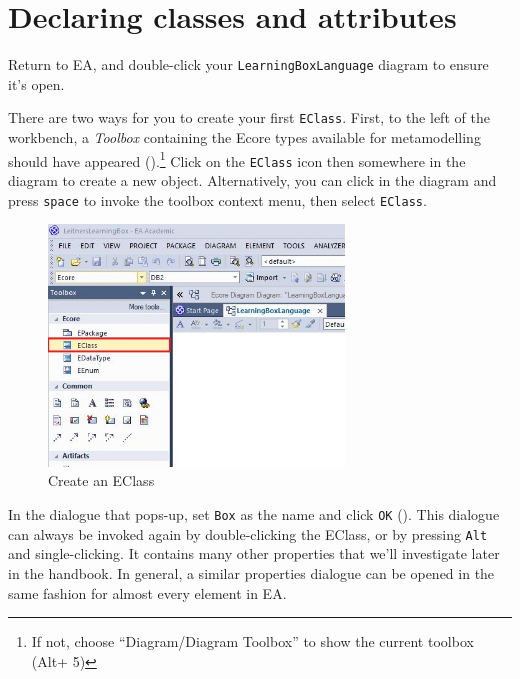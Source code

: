 \newpage
\section{Declaring classes and attributes}
\genHeader
\hypertarget{static:classes vis}{}

\begin{stepbystep}

\item Return to EA, and double-click your \texttt{LearningBoxLanguage} diagram to ensure it's open.

\vspace{0.5cm}

\item There are two ways for you to create your first \texttt{EClass}. First, to the left of the workbench, a \emph{Toolbox} containing
the Ecore types available for metamodelling should have appeared ().\footnote{If not, choose ``Diagram/Diagram Toolbox'' to show the
current toolbox (Alt+ 5)} Click on the \texttt{EClass} icon then somewhere in the diagram to create a new object. Alternatively, you can click in the diagram and press
\texttt{space} to invoke the toolbox context menu, then select \texttt{EClass}.

\vspace{0.5cm}

\begin{figure}[htbp]
	\centering
  \includegraphics[width=0.7\textwidth]{../../org.moflon.doc.handbook.02_leitnersLearningBox/2_staticSemantics/2_definingClasses/dcVisImages/ea_createEClass}
	\caption{Create an EClass}
	\label{ea:eclass}
\end{figure}

\vspace{0.5cm}

\item In the dialogue that pops-up, set \texttt{Box} as the name and click \texttt{OK} ().
This dialogue can always be invoked again by double-clicking the EClass, or by pressing \texttt{Alt} and single-clicking. It contains many other properties that we'll investigate later in the handbook. In general, a similar properties dialogue can be opened in the same fashion for almost every element in EA.


\end{stepbystep}
